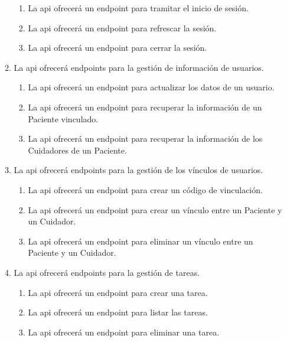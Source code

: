 \begin{enumerate}[label*=RI\arabic*.]
\begin{enumerate}[label*=\arabic*.]
        \begin{enumerate}[label*=\arabic*.]
            \item La \acrshort{api} ofrecerá un \gls{endpoint} para tramitar el inicio de sesión. 
            \item La \acrshort{api} ofrecerá un \gls{endpoint} para refrescar la sesión.
            \item La \acrshort{api} ofrecerá un \gls{endpoint} para cerrar la sesión.
        \end{enumerate}
        \item La \acrshort{api} ofrecerá \glspl{endpoint} para la gestión de información de usuarios. 
        \begin{enumerate}[label*=\arabic*.]
            \item La \acrshort{api} ofrecerá un \gls{endpoint} para actualizar los datos de un usuario. 
            \item La \acrshort{api} ofrecerá un \gls{endpoint} para recuperar la información de un Paciente vinculado. 
            \item La \acrshort{api} ofrecerá un \gls{endpoint} para recuperar la información de los Cuidadores de un Paciente. 
        \end{enumerate}
        \item La \acrshort{api} ofrecerá \glspl{endpoint} para la gestión de los vínculos de usuarios. 
        \begin{enumerate}[label*=\arabic*.]
            \item La \acrshort{api} ofrecerá un \gls{endpoint} para crear un código de vinculación. 
            \item La \acrshort{api} ofrecerá un \gls{endpoint} para crear un vínculo entre un Paciente y un Cuidador.
            \item La \acrshort{api} ofrecerá un \gls{endpoint} para eliminar un vínculo entre un Paciente y un Cuidador.
        \end{enumerate}
        \item La \acrshort{api} ofrecerá \glspl{endpoint} para la gestión de tareas. 
        \begin{enumerate}[label*=\arabic*.]
            \item La \acrshort{api} ofrecerá un \gls{endpoint} para crear una tarea. 
            \item La \acrshort{api} ofrecerá un \gls{endpoint} para listar las tareas. 
            \item La \acrshort{api} ofrecerá un \gls{endpoint} para eliminar una tarea.

\end{enumerate}
\end{enumerate}
\end{enumerate}
